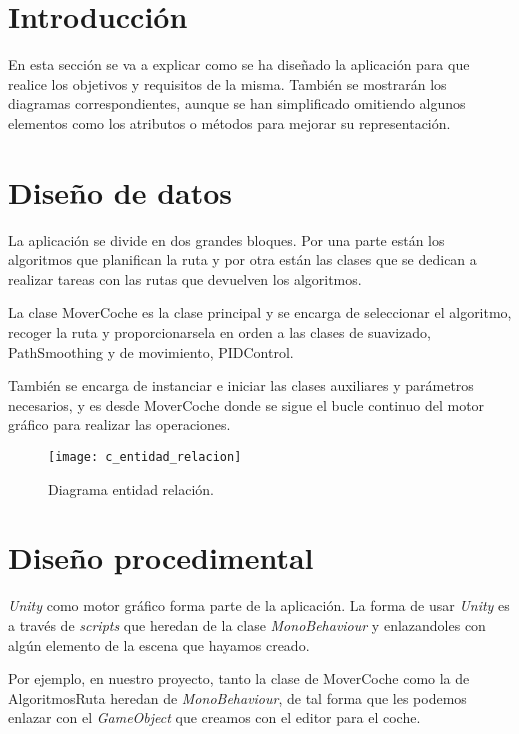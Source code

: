 
\section{Introducción}
En esta sección se va a explicar como se ha diseñado la aplicación para que realice los objetivos y requisitos de la misma. También se mostrarán los diagramas correspondientes, aunque se han simplificado omitiendo algunos elementos como los atributos o métodos para mejorar su representación.

\section{Diseño de datos}
La aplicación se divide en dos grandes bloques. Por una parte están los algoritmos que planifican la ruta y por otra están las clases que se dedican a realizar tareas con las rutas que devuelven los algoritmos.

La clase MoverCoche es la clase principal y se encarga de seleccionar el algoritmo, recoger la ruta y proporcionarsela en orden a las clases de suavizado, PathSmoothing y de movimiento, PIDControl.

También se encarga de instanciar e iniciar las clases auxiliares y parámetros necesarios, y es desde MoverCoche donde se sigue el bucle continuo del motor gráfico para realizar las operaciones.

\begin{figure}[htpb]
    \centering
    \texttt{[image: c\_entidad\_relacion]}
    \caption[Diagrama entidad relación]{Diagrama entidad relación.}
    \label{fig:centidadrelacion}
\end{figure}

\section{Diseño procedimental}
\textit{Unity} como motor gráfico forma parte de la aplicación. La forma de usar \textit{Unity} es a través de \textit{scripts} que heredan de la clase \textit{MonoBehaviour} y enlazandoles con algún elemento de la escena que hayamos creado.

Por ejemplo, en nuestro proyecto, tanto la clase de MoverCoche como la de AlgoritmosRuta heredan de \textit{MonoBehaviour}, de tal forma que les podemos enlazar con el \textit{GameObject} que creamos con el editor para el coche.

